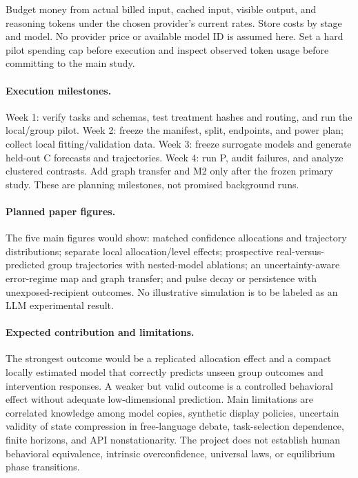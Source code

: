 \documentclass[11pt]{article}
\begin{document}
Budget money from actual billed input, cached input, visible output, and reasoning tokens under the chosen provider's current rates. Store costs by stage and model. No provider price or available model ID is assumed here. Set a hard pilot spending cap before execution and inspect observed token usage before committing to the main study.

\paragraph{Execution milestones.}
Week 1: verify tasks and schemas, test treatment hashes and routing, and run the local/group pilot. Week 2: freeze the manifest, split, endpoints, and power plan; collect local fitting/validation data. Week 3: freeze surrogate models and generate held-out C forecasts and trajectories. Week 4: run P, audit failures, and analyze clustered contrasts. Add graph transfer and M2 only after the frozen primary study. These are planning milestones, not promised background runs.

\paragraph{Planned paper figures.}
The five main figures would show: matched confidence allocations and trajectory distributions; separate local allocation/level effects; prospective real-versus-predicted group trajectories with nested-model ablations; an uncertainty-aware error-regime map and graph transfer; and pulse decay or persistence with unexposed-recipient outcomes. No illustrative simulation is to be labeled as an LLM experimental result.

\paragraph{Expected contribution and limitations.}
The strongest outcome would be a replicated allocation effect and a compact locally estimated model that correctly predicts unseen group outcomes and intervention responses. A weaker but valid outcome is a controlled behavioral effect without adequate low-dimensional prediction. Main limitations are correlated knowledge among model copies, synthetic display policies, uncertain validity of state compression in free-language debate, task-selection dependence, finite horizons, and API nonstationarity. The project does not establish human behavioral equivalence, intrinsic overconfidence, universal laws, or equilibrium phase transitions.
\end{document}
